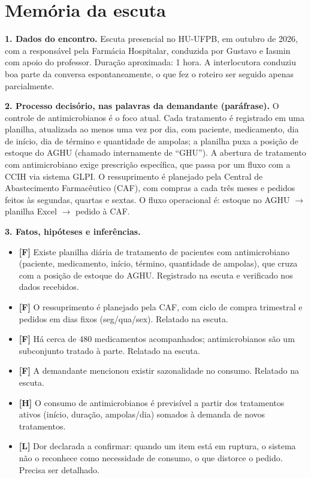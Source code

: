 \documentclass[11pt,a4paper]{article}
\newcommand{\F}{\textbf{\textcolor{verdeF}{[F]}}}
\newcommand{\Hh}{\textbf{\textcolor{laranjaH}{[H]}}}
\newcommand{\Ll}{\textbf{\textcolor{vermelhoL}{[L]}}}
\begin{document}
\section{Memória da escuta}

\textbf{1. Dados do encontro.} Escuta presencial no HU-UFPB, em outubro de 2026, com a responsável pela Farmácia Hospitalar, conduzida por Gustavo e Iasmin com apoio do professor. Duração aproximada: 1 hora. A interlocutora conduziu boa parte da conversa espontaneamente, o que fez o roteiro ser seguido apenas parcialmente.

\textbf{2. Processo decisório, nas palavras da demandante (paráfrase).} O controle de antimicrobianos é o foco atual. Cada tratamento é registrado em uma planilha, atualizada ao menos uma vez por dia, com paciente, medicamento, dia de início, dia de término e quantidade de ampolas; a planilha puxa a posição de estoque do AGHU (chamado internamente de ``GHU''). A abertura de tratamento com antimicrobiano exige prescrição específica, que passa por um fluxo com a CCIH via sistema GLPI. O ressuprimento é planejado pela Central de Abastecimento Farmacêutico (CAF), com compras a cada três meses e pedidos feitos às segundas, quartas e sextas. O fluxo operacional é: estoque no AGHU $\rightarrow$ planilha Excel $\rightarrow$ pedido à CAF.

\textbf{3. Fatos, hipóteses e inferências.}
\begin{itemize}
    \item \F{} Existe planilha diária de tratamento de pacientes com antimicrobiano (paciente, medicamento, início, término, quantidade de ampolas), que cruza com a posição de estoque do AGHU. Registrado na escuta e verificado nos dados recebidos.
    \item \F{} O ressuprimento é planejado pela CAF, com ciclo de compra trimestral e pedidos em dias fixos (seg/qua/sex). Relatado na escuta.
    \item \F{} Há cerca de 480 medicamentos acompanhados; antimicrobianos são um subconjunto tratado à parte. Relatado na escuta.
    \item \F{} A demandante mencionou existir sazonalidade no consumo. Relatado na escuta.
    \item \Hh{} O consumo de antimicrobianos é previsível a partir dos tratamentos ativos (início, duração, ampolas/dia) somados à demanda de novos tratamentos.
    \item \Ll{} Dor declarada a confirmar: quando um item está em ruptura, o sistema não o reconhece como necessidade de consumo, o que distorce o pedido. Precisa ser detalhado.
\end{itemize}
\end{document}
